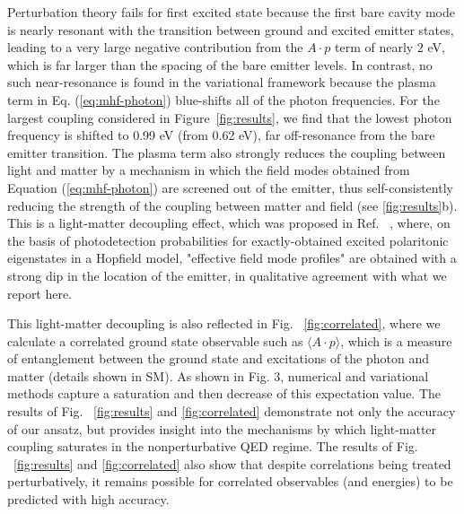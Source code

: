 \documentclass[aps,prl,twocolumn,
	groupedaddress,superscriptaddress,
	amsfonts,amssymb,amsmath,floatfix,
	citeautoscript]{revtex4-1}
\begin{document}
Perturbation theory fails for first excited state because the first bare cavity mode is nearly resonant with the transition between ground and excited emitter states, leading to a very large negative contribution from the $A\cdot p$ term of nearly $2$ eV, which is far larger than the spacing of the bare emitter levels. In contrast, no such near-resonance is found in the variational framework because the plasma term  in Eq. (\ref{eq:mhf-photon}) blue-shifts all of the photon frequencies. For the largest coupling considered in Figure~\ref{fig:results}, we find that the lowest photon frequency is shifted to 0.99 eV (from 0.62 eV),  far off-resonance from the bare emitter transition. The plasma term also strongly reduces the coupling between light and matter by a mechanism in which the field modes obtained from Equation (\ref{eq:mhf-photon}) are screened out of the emitter, thus self-consistently reducing the strength of the coupling between matter and field (see \ref{fig:results}b). This is a  light-matter decoupling effect, which was proposed in Ref. ~\cite{liberato2014}, where, on the basis of photodetection probabilities for exactly-obtained excited polaritonic eigenstates in a Hopfield model, "effective field mode profiles" are obtained with a strong dip in the location of the emitter, in qualitative agreement with what we report here.

This light-matter decoupling is also reflected in Fig. ~\ref{fig:correlated}, where we calculate a correlated ground state observable such as $\langle A\cdot p \rangle$, which is a measure of entanglement between the ground state and excitations of the photon and matter (details shown in SM). As shown in Fig. 3, numerical and variational methods capture a saturation and then decrease of this expectation value. The results of Fig. ~\ref{fig:results} and \ref{fig:correlated}  demonstrate not only the accuracy of our ansatz, but provides insight into the mechanisms by which light-matter coupling saturates in the nonperturbative QED regime. The results of Fig. ~\ref{fig:results} and \ref{fig:correlated} also show that despite correlations being treated perturbatively, it remains possible for correlated observables (and energies) to be predicted with high accuracy.
\end{document}
